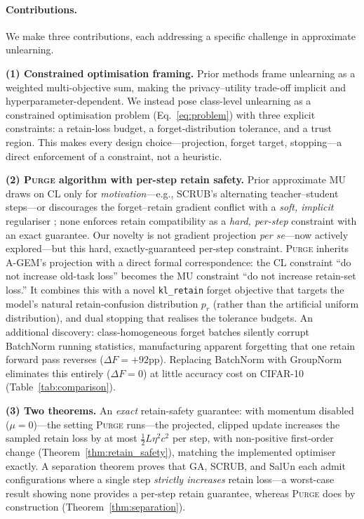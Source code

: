 \documentclass[letterpaper]{article} %
\newcommand{\ours}{\textsc{Purge}}
\newcommand{\klr}{\texttt{kl\_retain}}
\begin{document}
\paragraph{Contributions.}
We make three contributions, each addressing a specific challenge in approximate unlearning.

\textbf{(1) Constrained optimisation framing.}
Prior methods frame unlearning as a weighted multi-objective sum, making the privacy--utility trade-off implicit and hyperparameter-dependent.
We instead pose class-level unlearning as a constrained optimisation problem (Eq.~\ref{eq:problem}) with three explicit constraints: a retain-loss budget, a forget-distribution tolerance, and a trust region.
This makes every design choice---projection, forget target, stopping---a direct enforcement of a constraint, not a heuristic.

\textbf{(2) \ours{} algorithm with per-step retain safety.}
Prior approximate MU draws on CL only for \emph{motivation}---e.g., SCRUB's alternating teacher--student steps---or discourages the forget--retain gradient conflict with a \emph{soft, implicit} regulariser \citep{patel2025learning}; none enforces retain compatibility as a \emph{hard, per-step} constraint with an exact guarantee. Our novelty is not gradient projection \emph{per se}---now actively explored---but this hard, exactly-guaranteed per-step constraint.
\ours{} inherits A-GEM's projection with a direct formal correspondence: the CL constraint ``do not increase old-task loss'' becomes the MU constraint ``do not increase retain-set loss.''
It combines this with a novel \klr{} forget objective that targets the model's natural retain-confusion distribution $p_r$ (rather than the artificial uniform distribution), and dual stopping that realises the tolerance budgets.
An additional discovery: class-homogeneous forget batches silently corrupt BatchNorm running statistics, manufacturing apparent forgetting that one retain forward pass reverses ($\Delta F = +92$pp).
Replacing BatchNorm with GroupNorm eliminates this entirely ($\Delta F = 0$) at little accuracy cost on CIFAR-10 (Table~\ref{tab:comparison}).

\textbf{(3) Two theorems.}
An \emph{exact} retain-safety guarantee: with momentum disabled ($\mu {=} 0$)---the setting \ours{} runs---the projected, clipped update increases the sampled retain loss by at most $\tfrac{1}{2}L\eta^2 c^2$ per step, with non-positive first-order change (Theorem~\ref{thm:retain_safety}), matching the implemented optimiser exactly.
A separation theorem proves that GA, SCRUB, and SalUn each admit configurations where a single step \emph{strictly increases} retain loss---a worst-case result showing none provides a per-step retain guarantee, whereas \ours{} does by construction (Theorem~\ref{thm:separation}).
\end{document}
